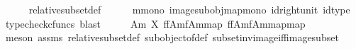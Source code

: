 \begin{isabellebody}
\ \ \ \ \isamarkupfalse%
\ relative{\isacharunderscore}{\kern0pt}subset{\isacharunderscore}{\kern0pt}def{}\isanewline
\ \ \ \ \isamarkupfalse%
\ m{\isacharunderscore}{\kern0pt}mono\ image{\isacharunderscore}{\kern0pt}subobj{\isacharunderscore}{\kern0pt}map{\isacharunderscore}{\kern0pt}mono\ id{\isacharunderscore}{\kern0pt}right{\isacharunderscore}{\kern0pt}unit{}\ id{\isacharunderscore}{\kern0pt}type\ \isamarkupfalse%
\ {\isacharparenleft}{\kern0pt}typecheck{\isacharunderscore}{\kern0pt}cfuncs{\isacharcomma}{\kern0pt}\ blast{\isacharparenright}{\kern0pt}\isanewline
\ \ \isamarkupfalse%
\ \isamarkupfalse%
\ {\isachardoublequoteopen}{\isacharparenleft}{\kern0pt}A{\isacharcomma}{\kern0pt}m{\isacharparenright}{\kern0pt}\ {\isasymsubseteq}\isactrlbsub X\isactrlesub \ {\isacharparenleft}{\kern0pt}f\isactrlsup {\isacharminus}{\kern0pt}f{\isasymlparr}A{\isasymrparr}\isactrlbsub m\isactrlesub {\isasymrparr}\isactrlbsub {\isacharbrackleft}{\kern0pt}f{\isasymlparr}A{\isasymrparr}\isactrlbsub m\isactrlesub {\isacharbrackright}{\kern0pt}map\isactrlesub {\isacharcomma}{\kern0pt}\ {\isacharbrackleft}{\kern0pt}f\isactrlsup {\isacharminus}{\kern0pt}f{\isasymlparr}A{\isasymrparr}\isactrlbsub m\isactrlesub {\isasymrparr}\isactrlbsub {\isacharbrackleft}{\kern0pt}f{\isasymlparr}A{\isasymrparr}\isactrlbsub m\isactrlesub {\isacharbrackright}{\kern0pt}map\isactrlesub {\isacharbrackright}{\kern0pt}map{\isacharparenright}{\kern0pt}{\isachardoublequoteclose}\isanewline
\ \ \ \ \isamarkupfalse%
\ {\isacharparenleft}{\kern0pt}meson\ assms\ relative{\isacharunderscore}{\kern0pt}subset{\isacharunderscore}{\kern0pt}def{}\ subobject{\isacharunderscore}{\kern0pt}of{\isacharunderscore}{\kern0pt}def{}\ subset{\isacharunderscore}{\kern0pt}inv{\isacharunderscore}{\kern0pt}image{\isacharunderscore}{\kern0pt}iff{\isacharunderscore}{\kern0pt}image{\isacharunderscore}{\kern0pt}subset{\isacharparenright}{\kern0pt}\isanewline
{}\isamarkupfalse%
%
\endisatagproof
{\isafoldproof}%
%
\isadelimproof
%
\endisadelimproof
%
\isadelimdocument
%
\endisadelimdocument
%
\isatagdocument
%
\isamarkuptrue%
%
\endisatagdocument
{\isafolddocument}%
%
\isadelimdocument
%
\endisadelimdocument
{}\isamarkupfalse%

\end{isabellebody}
